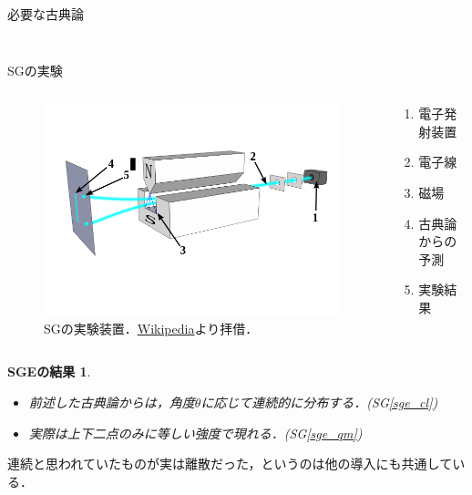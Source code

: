 \documentclass[dvipdfmx]{beamer}
\theoremstyle{break}
\newtheorem{result}[thm]{SGEの結果}
\begin{document}
\begin{frame}{必要な古典論}
\begin{columns}
\begin{column}{0.3\textwidth}
\begin{figure}
						\end{figure}
				\end{column}
		\end{columns}
\end{frame}


\begin{frame}[allowframebreaks]{SGの実験}
		\begin{columns}
		\begin{column}{0.6\textwidth}
		\begin{figure}[t]
				\centering
				\includegraphics[keepaspectratio, scale=0.25]{./img/device.png}
				\caption{SGの実験装置．\href{https://en.wikipedia.org/wiki/Stern\%E2\%80\%93Gerlach_experiment}{Wikipedia}より拝借．}
		\end{figure}
		\end{column}
		\begin{column}{0.4\textwidth}
		\begin{enumerate}[SG1]
				[default]
				\item 電子発射装置
				\item 電子線
				\item 磁場\label{sge_dev}
				\item 古典論からの予測\label{sge_cl}
				\item 実験結果\label{sge_qm}
		\end{enumerate}
		\end{column}
		\end{columns}
		\begin{result}\label{sgx}
				\begin{itemize}
						\item 前述した古典論からは，角度$\theta$に応じて連続的に分布する．(SG\ref{sge_cl})
						\item 実際は\alert{上下二点のみ}に\alert{等しい強度}で現れる．(SG\ref{sge_qm})
				\end{itemize}
		\end{result}
		連続と思われていたものが実は離散だった，というのは他の導入にも共通している．


\end{frame}
\end{document}
